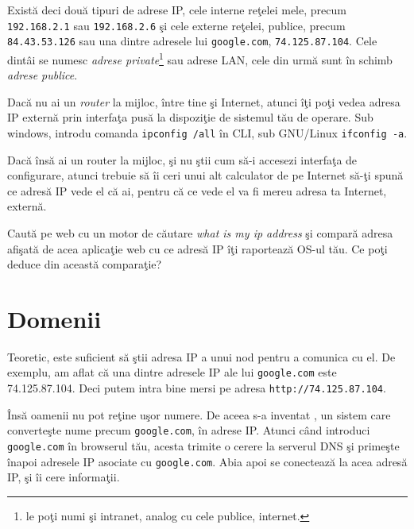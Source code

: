 \sloppy Există deci două tipuri de adrese IP, cele interne reţelei mele, precum \texttt{192.168.2.1}
sau \texttt{192.168.2.6} şi cele externe reţelei, publice, precum \texttt{84.43.53.126} sau una
dintre adresele lui \texttt{google.com}, \texttt{74.125.87.104}.
Cele dintâi se numesc \textsl{adrese private}\footnote{le poţi numi şi {\glqq}intranet{\grqq},
analog cu cele publice, {\glqq}internet{\grqq}.}
sau adrese LAN, cele din urmă sunt în schimb \textsl{adrese publice}.


Dacă nu ai un \textsl{router} la mijloc, între tine şi Internet, atunci îţi poţi vedea adresa IP
externă prin interfaţa pusă la dispoziţie de sistemul tău de operare. Sub windows, introdu
comanda \texttt{ipconfig /all} în CLI, sub GNU/Linux \texttt{ifconfig -a}.

Dacă însă ai un router la mijloc, şi nu ştii cum să-i accesezi interfaţa de configurare,
atunci trebuie să îi ceri unui alt calculator de pe Internet să-ţi spună ce adresă IP
vede el că ai, pentru că ce vede el va fi mereu adresa ta Internet, externă.

\begin{Exercise}[title={What is my IP Address?},difficulty=1]
Caută pe web cu un motor de căutare \textit{what is my ip address} şi compară
adresa afişată de acea aplicaţie web cu ce adresă IP îţi raportează OS-ul tău.
Ce poţi deduce din această comparaţie?
\end{Exercise}

\section{Domenii}
Teoretic, este suficient să ştii adresa IP a unui nod pentru a comunica cu el. De exemplu,
am aflat că una dintre adresele IP ale lui \texttt{google.com} este 74.125.87.104. Deci putem
intra bine mersi pe adresa \texttt{http://74.125.87.104}.

Însă oamenii nu pot reţine uşor numere. De aceea s-a inventat ,
un sistem care converteşte nume precum \texttt{google.com}, în adrese IP. Atunci când introduci
\texttt{google.com} în browserul tău, acesta trimite o cerere la serverul DNS şi primeşte
înapoi adresele IP asociate cu \texttt{google.com}. Abia apoi se conectează la acea adresă IP,
şi îi cere informaţii.

